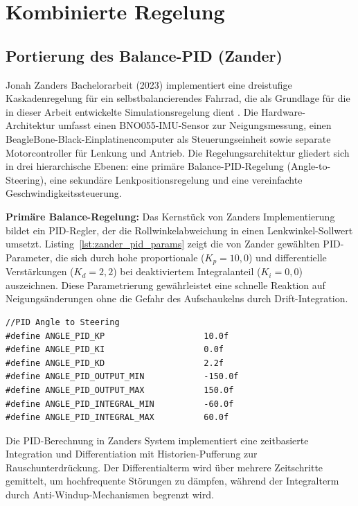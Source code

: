 \section{Kombinierte Regelung}
\subsection{Portierung des Balance-PID (Zander)}

Jonah Zanders Bachelorarbeit (2023) implementiert eine dreistufige Kaskadenregelung für ein selbstbalancierendes Fahrrad, die als Grundlage 
für die in dieser Arbeit entwickelte Simulationsregelung dient \citep{zander2023}. Die Hardware-Architektur umfasst einen BNO055-IMU-Sensor 
zur Neigungsmessung, einen BeagleBone-Black-Einplatinencomputer als Steuerungseinheit sowie separate Motorcontroller für Lenkung und Antrieb. 
Die Regelungsarchitektur gliedert sich in drei hierarchische Ebenen: eine primäre Balance-PID-Regelung (Angle-to-Steering), eine sekundäre 
Lenkpositionsregelung und eine vereinfachte Geschwindigkeitssteuerung.

\textbf{Primäre Balance-Regelung:} Das Kernstück von Zanders Implementierung bildet ein PID-Regler, der die Rollwinkelabweichung in einen 
Lenkwinkel-Sollwert umsetzt. Listing~\ref{lst:zander_pid_params} zeigt die von Zander gewählten PID-Parameter, die sich durch hohe 
proportionale (\(K_p = 10{,}0\)) und differentielle Verstärkungen (\(K_d = 2{,}2\)) bei deaktiviertem Integralanteil (\(K_i = 0{,}0\)) 
auszeichnen. Diese Parametrierung gewährleistet eine schnelle Reaktion auf Neigungsänderungen ohne die Gefahr des Aufschaukelns durch 
Drift-Integration.

\begin{lstlisting}[style=wbt_c,caption={PID-Parameter in Zanders Hardware-Implementierung},label={lst:zander_pid_params}]
//PID Angle to Steering
#define ANGLE_PID_KP                    10.0f
#define ANGLE_PID_KI                    0.0f
#define ANGLE_PID_KD                    2.2f 
#define ANGLE_PID_OUTPUT_MIN            -150.0f
#define ANGLE_PID_OUTPUT_MAX            150.0f
#define ANGLE_PID_INTEGRAL_MIN          -60.0f
#define ANGLE_PID_INTEGRAL_MAX          60.0f
\end{lstlisting}

Die PID-Berechnung in Zanders System implementiert eine zeitbasierte Integration und Differentiation mit Historien-Pufferung zur 
Rauschunterdrückung. Der Differentialterm wird über mehrere Zeitschritte gemittelt, um hochfrequente Störungen zu dämpfen, 
während der Integralterm durch Anti-Windup-Mechanismen begrenzt wird.

